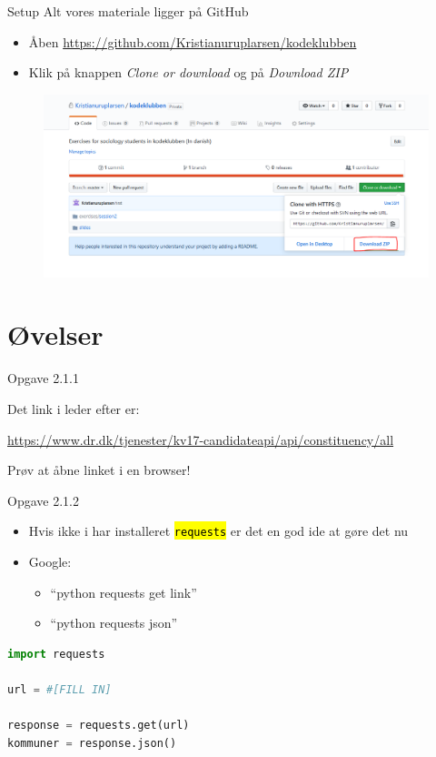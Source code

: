 \documentclass[10pt, hyperref = {colorlinks=true, linkcolor=green}]{beamer}
\let\OldTexttt\texttt
\renewcommand{\texttt}[1]{\OldTexttt{\hl{#1}}}%
\begin{document}
\begin{frame}[fragile]{Setup}
  Alt vores materiale ligger på GitHub
\begin{itemize}
  \item Åben \href{https://github.com/Kristianuruplarsen/kodeklubben}{https://github.com/Kristianuruplarsen/kodeklubben}
  \item Klik på knappen \textit{Clone or download} og på \textit{Download ZIP}
\end{itemize}

\begin{figure}
  \center
  \includegraphics[width=\textwidth]{figs/setup.PNG}
\end{figure}
\end{frame}



\section{Øvelser}
\begin{frame}[fragile]{Opgave 2.1.1}

\pause
Det link i leder efter er:
\begin{centering}
\href{'https://www.dr.dk/tjenester/kv17-candidateapi/api/constituency/all'}{https://www.dr.dk/tjenester/kv17-candidateapi/api/constituency/all}
\end{centering}
Prøv at åbne linket i en browser!

\end{frame}

\begin{frame}[fragile]{Opgave 2.1.2}

\begin{itemize}
  \item Hvis ikke i har installeret \texttt{requests} er det en god ide at gøre det nu
  \item Google:
  \begin{itemize}
    \item ``python requests get link''
    \item ``python requests json''
  \end{itemize}
\end{itemize}

\pause
\begin{lstlisting}[language=python]
import requests

url = #[FILL IN]

response = requests.get(url)
kommuner = response.json()
\end{lstlisting}
\end{frame}
\end{document}
